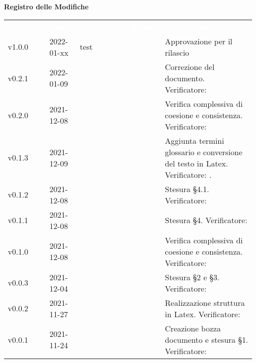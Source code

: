 
{\LARGE{\textbf{Registro delle Modifiche}}} \\
\renewcommand{\arraystretch}{1.5}
\begin{longtable}{ m{}<{\centering}  m{}<{\centering}  m{}<{\centering}  m{}<{\centering}  m{}<{\centering} }
	\rowcolor{darkblue}
	\textcolor{white}{\textbf{Versione}} &\textcolor{white}{\textbf{Data}}& \textcolor{white}{\textbf{Nominativo}} & \textcolor{white}{\textbf{Ruolo}}& \textcolor{white}{\textbf{Descrizione}} \\ 	
	v1.0.0& 2022-01-xx & test & \RE{}  & Approvazione per il rilascio\\
	
	v0.2.1& 2022-01-09 &  \MB{} & \AM{}  & Correzione del documento. Verificatore: \textit{\FP}\\

	v0.2.0& 2021-12-08 & \MB{} & \VE{}  & Verifica complessiva di coesione e consistenza. Verificatore: \textit{\FP}\\	
	
	v0.1.3& 2021-12-09 &  \EP{} & \RE{} & Aggiunta termini glossario e conversione del testo in Latex. Verificatore: \textit{\FP}.\\

	v0.1.2& 2021-12-08 & \GC{} & \AM{} & Stesura §4.1. Verificatore: \textit{}\\	
	
	v0.1.1& 2021-12-08 & \MB{} & \AM{} & Stesura §4. Verificatore: \textit{\FP}\\

	v0.1.0& 2021-12-08 &  \EP{} & \VE{} & Verifica complessiva di coesione e consistenza. Verificatore: \textit{\FP} \\	

	v0.0.3& 2021-12-04 &  \MB{} & \AM{} & Stesura §2 e §3. Verificatore: \textit{\FP} \\

	v0.0.2& 2021-11-27 &  \EP{} & \AM{}  & Realizzazione struttura in Latex. Verificatore: \textit{\FP}\\

	v0.0.1& 2021-11-24 &  \MB{} & \RE{} & Creazione bozza documento e stesura §1. Verificatore: \textit{\FP} \\

\end{longtable}

\pagebreak
